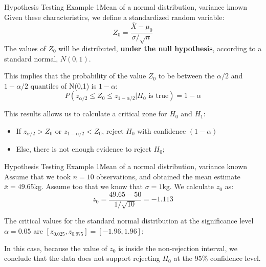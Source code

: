 \begin{frame}{Hypothesis Testing Example 1}{Mean of a normal distribution, variance known}
  Given these characteristics, we define a standardized random variable:
  \begin{equation*}
    Z_0 = \frac{\bar{X} - \mu_0}{\sigma / \sqrt{n}}
  \end{equation*}
  The values of ${Z_0}$ will be distributed, {\bf under the null hypothesis}, according to a standard normal, $N(0,1)$.\medskip

  This implies that the probability of the value $Z_0$ to be between the $\alpha/2$ and $1-\alpha/2$ quantiles of N(0,1) is $1-\alpha$:
  \begin{equation*}
    P(z_{\alpha/2} \leq Z_0 \leq z_{1-\alpha/2}|H_0\text{ is true}) = 1-\alpha
  \end{equation*}\medskip

  This results allows us to calculate a critical zone for $H_0$ and $H_1$:
  \begin{itemize}
    \item If $z_{\alpha/2} > Z_0$ or $z_{1-\alpha/2} < Z_0$, reject $H_0$ with confidence $(1-\alpha)$
    \item Else, there is not enough evidence to reject $H_0$;
  \end{itemize}
\end{frame}

\begin{frame}{Hypothesis Testing Example 1}{Mean of a normal distribution, variance known}
  Assume that we took $n=10$ observations, and obtained the mean estimate $\bar{x} = 49.65$kg. Assume too that we know that $\sigma = 1$kg. We calculate $z_0$ as:
  \begin{equation*}
    z_0 = \frac{49.65 - 50}{1 / \sqrt{10}} = -1.113
  \end{equation*}\bigskip

  The critical values for the standard normal distribution at the significance level $\alpha = 0.05$ are $[z_{0.025}, z_{0.975}] = [-1.96,1.96]$;\bigskip

  In this case, because the value of $z_0$ is inside the non-rejection interval, we conclude that the data does not support rejecting $H_0$ at the 95\% confidence level.
\end{frame}

